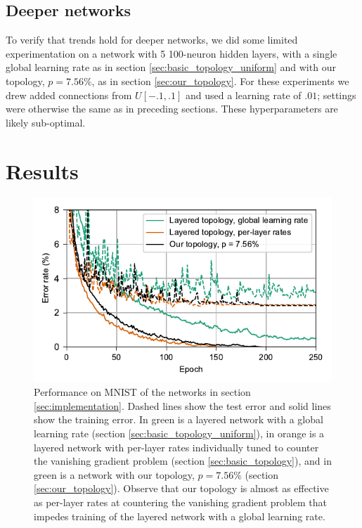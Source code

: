 \documentclass[utf8]{frontiersSCNS}
\begin{document}
\subsection{Deeper networks}
\label{sec:deep_topology}

To verify that trends hold for deeper networks, we did some limited experimentation on a network with 5 100-neuron hidden layers, with a single global learning rate as in section \ref{sec:basic_topology_uniform} and with our topology, $p=7.56\%$, as in section \ref{sec:our_topology}. For these experiments we drew added connections from $U[-.1, .1]$ and used a learning rate of $.01$; settings were otherwise the same as in preceding sections. These hyperparameters are likely sub-optimal.

\section{Results}

\begin{figure}
  \centering
  \includegraphics[width=\columnwidth]{figures/MNIST_network_comparison.pdf}
  \caption{Performance on MNIST of the networks in section \ref{sec:implementation}. Dashed lines show the test error and solid lines show the training error. In green is a layered network with a global learning rate (section \ref{sec:basic_topology_uniform}), in orange is a layered network with per-layer rates individually tuned to counter the vanishing gradient problem (section \ref{sec:basic_topology}), and in green is a network with our topology, $p=7.56\%$ (section \ref{sec:our_topology}). Observe that our topology is almost as effective as per-layer rates at countering the vanishing gradient problem that impedes training of the layered network with a global learning rate.}
  \label{fig:mnist_comparison}
\end{figure}
\end{document}

